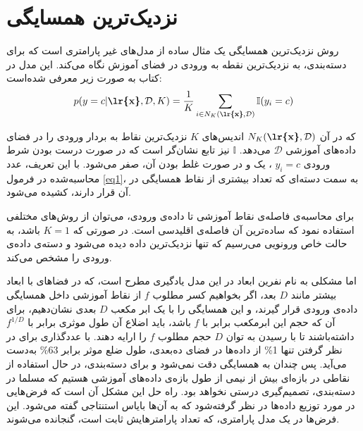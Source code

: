 \documentclass[11.5pt,a4paper]{article}
\begin{document}
\section{ نزدیک‌ترین همسایگی}
روش  نزدیک‌ترین همسایگی یک مثال ساده‌ از مدل‌های غیر پارامتری است که برای دسته‌بندی، به  نزدیک‌ترین نقطه‌ به ورودی در فضای آموزش نگاه می‌کند. این مدل در کتاب به صورت زیر معرفی شده‌است:
\begin{equation}
\label{eq1}
p(y=c|\text{\textbf{\lr{x}}},\mathcal{D},K) = {1 \over K} \sum_{i \in{N_{K}(\text{\textbf{\lr{x}}},\mathcal{D})} } \mathbb{I}(y_i = c )
\end{equation}

که در آن
 $N_{K}(\text{\textbf{\lr{x}}},\mathcal{D})$
 اندیس‌های 
 $K$
 نزدیک‌ترین نقاط به بردار ورودی 
\textbf{}
را در فضای داده‌های آموزشی 
$\mathcal{D}$
می‌دهد. 
$\mathbb{I}$
نیز تابع نشان‌گر است که در صورت درست بودن شرط ورودی
$y_i = c$
، یک و در صورت غلط بودن آن، صفر می‌شود. با این تعریف، عدد محاسبه‌شده در فرمول \ref{eq1}، به سمت دسته‌ای که تعداد بیشتری از نقاط همسایگی در آن قرار دارند، کشیده می‌شود. 

برای محاسبه‌ی فاصله‌ی نقاط آموزشی تا داده‌ی ورودی، می‌توان از روش‌های مختلفی استفاده نمود که ساده‌ترین آن فاصله‌ی اقلیدسی است. در صورتی که
 $K=1$
 باشد، به حالت خاص ورونویی می‌رسیم که تنها نزدیک‌ترین داده دیده می‌شود و دسته‌ی داده‌ی ورودی را مشخص می‌کند. 
 
 اما مشکلی به نام نفرین ابعاد در این مدل یادگیری مطرح است، که در فضاهای با ابعاد بیشتر مانند $D$ بعد، اگر بخواهیم کسر مطلوب $f$ از نقاط آموزشی داخل همسایگی داده‌ی ورودی قرار گیرند، و این همسایگی را با یک ابر مکعب $D$ بعدی نشان‌دهیم، برای آن‌ که حجم این ابرمکعب برابر با $f$ باشد، باید اضلاع آن طول موثری برابر با 
 $f^{1 / D}$
 داشته‌باشند تا با رسیدن به توان $D$ حجم مطلوب $f$ را ارایه‌ دهند. با عددگذاری برای در نظر گرفتن تنها 1\% از داده‌ها در فضای ده‌بعدی، طول ضلع موثر برابر 63\% به‌دست می‌آید. پس چندان به همسایگی دقت نمی‌شود و برای دسته‌بندی، در حال استفاده از نقاطی در بازه‌ای بیش از نیمی از طول بازه‌ی داده‌های آموزشی هستیم که مسلما در دسته‌بندی، تصمیم‌گیری درستی نخواهد بود. 
 راه حل این مشکل آن است که فرض‌هایی در مورد توزیع داده‌ها در نظر گرفته‌شود که به آن‌ها بایاس استنتاجی گفته می‌شود. این فرض‌ها در یک مدل پارامتری، که تعداد پارامترهایش ثابت است، گنجانده می‌شوند. 
\end{document}
